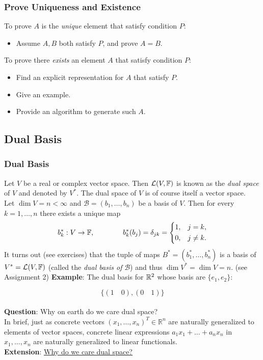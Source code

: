 \documentclass[12pt, t]{beamer}
\renewcommand{\emph}[1]{{\color{Turquoise3}\textsl{#1}}}
\newcommand{\nullspace}{~\\[15pt]}
\begin{document}
\begin{frame}
    \frametitle{Prove Uniqueness and Existence}
    To prove $A$ is the \emph{unique} element that satisfy condition $P$:
    \begin{itemize}
        \item Assume $A,B$ both satisfy $P$, and prove $A=B$.
    \end{itemize}
    To prove there \emph{exists} an element $A$ that satisfy condition $P$:
    \begin{itemize}
        \item Find an explicit representation for $A$ that satisfy $P$.
        \item Give an example.
        \item Provide an algorithm to generate such $A$.
    \end{itemize}
\end{frame}

\subsection{Dual Basis}
\begin{frame}
    \frametitle{Dual Basis}
    Let $V$ be a real or complex vector space. Then $\mathcal{L}(V,\mathbb{F})$ is known as the \emph{dual space} of $V$ and denoted by $V^*$. The dual space of $V$ is of course itself a vector space.\\[9pt]
    Let $\dim V=n<\infty$ and $\mathcal{B}=(b_1,\ldots,b_n)$ be a basis of $V$. Then for every $k=1,\ldots,n$ there exists a unique map
    \[b_k^*:V\to\mathbb{F},\qquad\qquad b_k^*(b_j)=\delta_{jk}=\left\{\begin{aligned}1,\quad &j=k,\\ 0,\quad &j\neq k.\end{aligned}\right.\]
    It turns out (see exercises) that the tuple of maps $B^*=(b_1^*,\ldots,b_n^*)$ is a basis of $V^*=\mathcal{L}(V,\mathbb{F})$ (called the \emph{dual basis of} $\mathcal{B}$) and thus $\dim V^*=\dim V=n$. (see Assignment 2)
    \newpage
    \textbf{Example}:
    The dual basis for $\mathbb{R}^2$ whose basis are $\{e_1,e_2\}$:

    \[\{(1\quad 0),(0\quad 1)\}\]\nullspace

    \textbf{Question}: Why on earth do we care dual space?
    \nullspace
    In brief, just as concrete vectors $\left(x_{1}, \ldots, x_{n}\right)^T \in \mathbb{R}^{n}$ are naturally generalized to elements of vector spaces, concrete linear expressions $a_{1} x_{1}+\ldots+a_{n} x_{n}$ in $x_{1}, \ldots, x_{n}$ are naturally generalized to linear functionals.
    \nullspace
    \textbf{Extension}: \href{https://math.stackexchange.com/questions/3749/why-do-we-care-about-dual-spaces}{Why do we care dual space?}
\end{frame}
\end{document}
